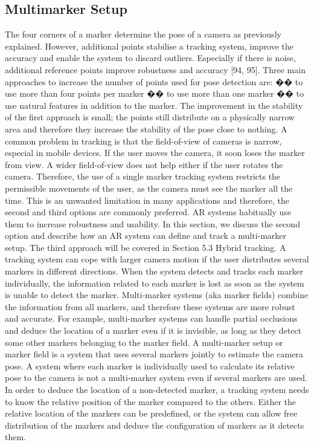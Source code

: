 \subsection{Multimarker Setup}

The four corners of a marker determine the pose of a camera as previously explained.
However, additional points stabilise a tracking system, improve the accuracy
and enable the system to discard outliers. Especially if there is noise, additional
reference points improve robustness and accuracy [94, 95]. Three main
approaches to increase the number of points used for pose detection are:
�� to use more than four points per marker
�� to use more than one marker
�� to use natural features in addition to the marker.
The improvement in the stability of the first approach is small; the points still distribute
on a physically narrow area and therefore they increase the stability of the
pose close to nothing. A common problem in tracking is that the field-of-view of
cameras is narrow, especial in mobile devices. If the user moves the camera, it
soon loses the marker from view. A wider field-of-view does not help either if the
user rotates the camera. Therefore, the use of a single marker tracking system
restricts the permissible movements of the user, as the camera must see the
marker all the time.
This is an unwanted limitation in many applications and therefore, the second
and third options are commonly preferred. AR systems habitually use them to
increase robustness and usability. In this section, we discuss the second option and describe how an AR system can define and track a multi-marker setup. The
third approach will be covered in Section 5.3 Hybrid tracking.
A tracking system can cope with larger camera motion if the user distributes
several markers in different directions. When the system detects and tracks each
marker individually, the information related to each marker is lost as soon as the
system is unable to detect the marker. Multi-marker systems (aka marker fields)
combine the information from all markers, and therefore these systems are more
robust and accurate. For example, multi-marker systems can handle partial occlusions
and deduce the location of a marker even if it is invisible, as long as they
detect some other markers belonging to the marker field.
A multi-marker setup or marker field is a system that uses several markers
jointly to estimate the camera pose. A system where each marker is individually
used to calculate its relative pose to the camera is not a multi-marker system even
if several markers are used.
In order to deduce the location of a non-detected marker, a tracking system
needs to know the relative position of the marker compared to the others. Either
the relative location of the markers can be predefined, or the system can allow
free distribution of the markers and deduce the configuration of markers as it detects
them.

